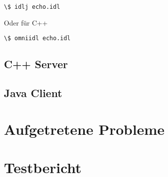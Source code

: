 \documentclass[11pt]{article}
\begin{document}
\begin{lstlisting}
\$ idlj echo.idl
\end{lstlisting}

Oder für C++

\begin{lstlisting}
\$ omniidl echo.idl
\end{lstlisting}

\subsection{C++ Server}

\subsection{Java Client}



\section{Aufgetretene Probleme}

\section{Testbericht}
\end{document}
